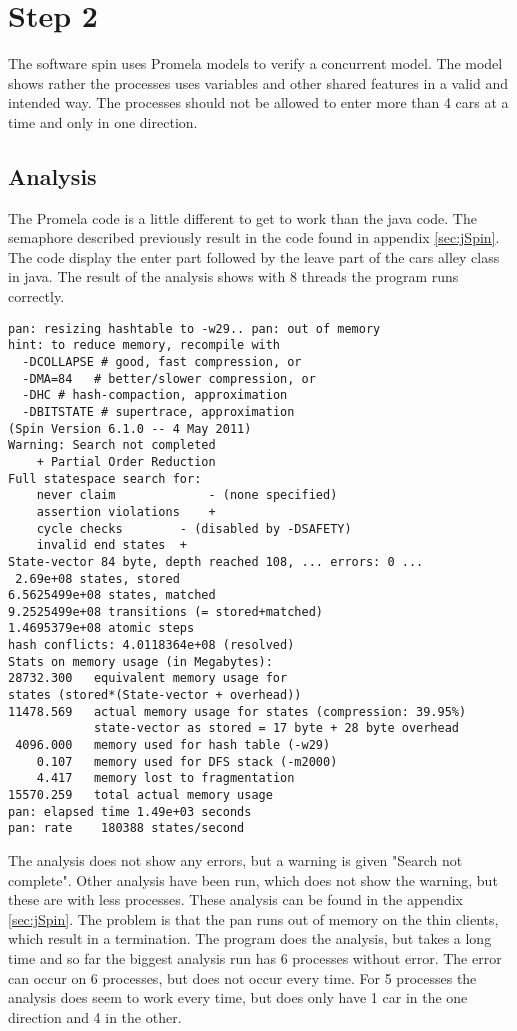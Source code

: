 \section{Step 2}
The software spin uses Promela models to verify a concurrent model. The model shows rather the processes uses variables and other shared features in a valid and intended way. The processes should not be allowed to enter more than 4 cars at a time and only in one direction.
\\

\subsection{Analysis}
The Promela code is a little different to get to work than the java code. The semaphore described previously result in the code found in appendix \ref{sec:jSpin}. The code display the enter part followed by the leave part of the cars alley class in java. The result of the analysis shows with 8 threads the program runs correctly. 

\begin{lstlisting}
pan: resizing hashtable to -w29.. pan: out of memory
hint: to reduce memory, recompile with
  -DCOLLAPSE # good, fast compression, or
  -DMA=84   # better/slower compression, or
  -DHC # hash-compaction, approximation
  -DBITSTATE # supertrace, approximation
(Spin Version 6.1.0 -- 4 May 2011)
Warning: Search not completed
	+ Partial Order Reduction
Full statespace search for:
	never claim         	- (none specified)
	assertion violations	+
	cycle checks       	- (disabled by -DSAFETY)
	invalid end states	+
State-vector 84 byte, depth reached 108, ... errors: 0 ...
 2.69e+08 states, stored
6.5625499e+08 states, matched
9.2525499e+08 transitions (= stored+matched)
1.4695379e+08 atomic steps
hash conflicts: 4.0118364e+08 (resolved)
Stats on memory usage (in Megabytes):
28732.300	equivalent memory usage for 
states (stored*(State-vector + overhead))
11478.569	actual memory usage for states (compression: 39.95%)
         	state-vector as stored = 17 byte + 28 byte overhead
 4096.000	memory used for hash table (-w29)
    0.107	memory used for DFS stack (-m2000)
    4.417	memory lost to fragmentation
15570.259	total actual memory usage
pan: elapsed time 1.49e+03 seconds
pan: rate    180388 states/second
\end{lstlisting}

The analysis does not show any errors, but a warning is given "Search not complete". Other analysis have been run, which does not show the warning, but these are with less processes. These analysis can be found in the appendix \ref{sec:jSpin}. The problem is that the pan runs out of memory on the thin clients, which result in a termination. The program does the analysis, but takes a long time and so far the biggest analysis run has 6 processes without error. The error can occur on 6 processes, but does not occur every time. For 5 processes the analysis does seem to work every time, but does only have 1 car in the one direction and 4 in the other.

